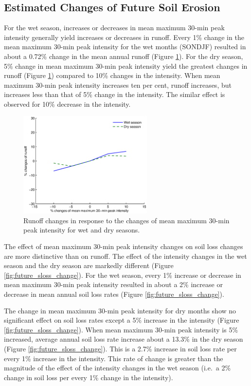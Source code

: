 \subsection{Estimated Changes of Future Soil Erosion}
\label{sec:EstimatedFutureSoilErosion}
For the wet season, increases or decreases in mean maximum 30-min peak intensity
generally yield increases or decreases in runoff. Every 1\% change in the mean
maximum 30-min peak intensity for the wet months (SONDJF) resulted in about a
0.72\% change in the mean annual runoff (Figure \ref{fig:future_roff_change}).
For the dry season, 5\% change in mean maximum 30-min peak intensity yield the
greatest changes in runoff (Figure \ref{fig:future_roff_change}) compared to
10\% changes in the intensity. When mean maximum 30-min peak intensity increases
ten per cent, runoff increases, but increases less than that of 5\% change in
the intensity. The similar effect is observed for 10\% decrease in the
intensity.

\begin{figure}[htbp]
  \centering
    \includegraphics[width=0.6\textwidth]{./img/future_roff_change}
  \caption{Runoff changes in response to the changes of mean maximum
30-min peak intensity for wet and dry seasons.}
  \label{fig:future_roff_change}
\end{figure}

The effect of mean maximum 30-min peak intensity changes on soil loss changes
are more distinctive than on runoff. The effect of the intensity changes in the
wet season and the dry season are markedly different (Figure
\ref{fig:future_sloss_change}). For the wet season, every 1\% increase or
decrease in mean maximum 30-min peak intensity resulted in about a 2\% increase
or decrease in mean annual soil loss rates (Figure
\ref{fig:future_sloss_change}).

The change in mean maximum 30-min peak intensity for dry months show no
significant effect on soil loss rates except a 5\% increase in the intensity
(Figure \ref{fig:future_sloss_change}). When mean maximum 30-min peak intensity
is 5\% increased, average annual soil loss rate increase about a 13.3\% in the
dry season (Figure \ref{fig:future_sloss_change}). This is a 2.7\% increase in
soil loss rate per every 1\% increase in the intensity. This rate of change is
greater than the magnitude of the effect of the intensity changes in the wet
season (i.e.\ a 2\% change in soil loss per every 1\% change in the intensity).

